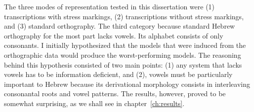 The three modes of representation tested in this dissertation were (1) transcriptions with stress markings, (2) transcriptions without stress markings, and (3) standard orthography. The third category because standard Hebrew orthography for the most part lacks vowels. Its alphabet consists of only consonants. I initially hypothesized that the models that were induced from the orthographic data would produce the worst-performing models. The reasoning behind this hypothesis consisted of two main points: (1) any system that lacks vowels has to be information deficient, and (2), vowels must be particularly important to Hebrew because its derivational morphology consists in interleaving consonantal roots and vowel patterns. The results, however, proved to be somewhat surprising, as we shall see in chapter~\ref{ch:results}.


